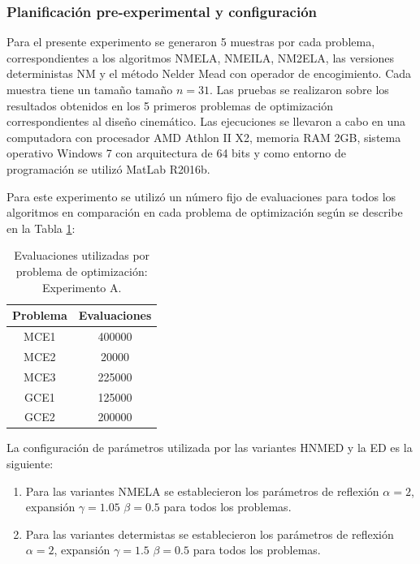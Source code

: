  \subsubsection{Planificación pre-experimental y configuración}
 Para el presente experimento se generaron 5 muestras por cada problema, correspondientes a los algoritmos NMELA, NMEILA, NM2ELA, las versiones deterministas NM y el método Nelder Mead con operador de encogimiento. Cada muestra tiene un tamaño tamaño $n=31$. Las pruebas se realizaron sobre los resultados obtenidos en los 5 primeros problemas de optimización correspondientes al diseño cinemático. Las ejecuciones se llevaron a cabo en una computadora con procesador AMD Athlon II X2, memoria RAM 2GB, sistema operativo Windows 7 con arquitectura de 64 bits y como entorno de programación se utilizó  MatLab R2016b. 
 
 Para este experimento se utilizó un número fijo de evaluaciones para todos los algoritmos en comparación en cada problema de optimización según se describe en la Tabla \ref{tab:Evaluaciones utilizadas por problema de optimización: Experimento A.}:
 
 \begin{table}[]
 	\centering
 	\caption{Evaluaciones utilizadas por problema de optimización: Experimento A.}
 	\label{tab:Evaluaciones utilizadas por problema de optimización: Experimento A.}
 	\begin{tabular}{cc}
 		\textbf{Problema} &   \textbf{Evaluaciones}     \\
 		\hline
 		MCE1   &   400000       \\
 		MCE2   &   20000       \\
 		MCE3   &   225000      \\
 		GCE1   &   125000       \\
 		GCE2   &   200000      \\
 	\end{tabular}
 \end{table}
 La configuración de parámetros utilizada por las variantes HNMED y la ED es la siguiente:
 \begin{enumerate}
 	\item Para las variantes NMELA se establecieron los parámetros de reflexión $\alpha=2$, expansión $\gamma=1.05$ $\beta=0.5$ para todos los problemas.
 	 	\item Para las variantes determistas se establecieron los parámetros de reflexión $\alpha=2$, expansión $\gamma=1.5$ $\beta=0.5$ para todos los problemas.
 \end{enumerate}
 
